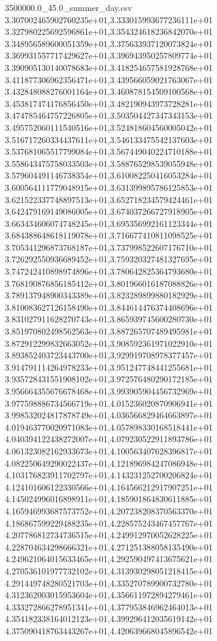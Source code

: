 \begin{filecontents*}{3500000.0_45.0_summer_day.csv}
3.307002465902760235e+01,3.333015993677236111e+01
3.327980225692596861e+01,3.354324618236842070e+01
3.348956589600051359e+01,3.375633937120073824e+01
3.369931557717429627e+01,3.396943950257809774e+01
3.390905130140078683e+01,3.418254657581928768e+01
3.411877306962356471e+01,3.439566059021763067e+01
3.432848088276001164e+01,3.460878154509100568e+01
3.453817474176856450e+01,3.482190943973728281e+01
3.474785464757226805e+01,3.503504427347343153e+01
3.495752060111540516e+01,3.524818604560005042e+01
3.516717260334437611e+01,3.546133475542137603e+01
3.537681065517799084e+01,3.567449040224710188e+01
3.558643475758033503e+01,3.588765298539055948e+01
3.579604491146738354e+01,3.610082250416053284e+01
3.600564111779048915e+01,3.631399895786125853e+01
3.621522337748897513e+01,3.652718234579424461e+01
3.642479169149086005e+01,3.674037266727918905e+01
3.663434606074748245e+01,3.695356992161123344e+01
3.684388648618119078e+01,3.716677410811098525e+01
3.705341296873768187e+01,3.737998522607176710e+01
3.726292550936689452e+01,3.759320327481327695e+01
3.747242410898974896e+01,3.780642825364793680e+01
3.768190876856185412e+01,3.801966016187088826e+01
3.789137948900343389e+01,3.823289899880182929e+01
3.810083627126158490e+01,3.844614476374408696e+01
3.831027911628270743e+01,3.865939745600280730e+01
3.851970802498562563e+01,3.887265707489495981e+01
3.872912299832663052e+01,3.908592361971022910e+01
3.893852403723443700e+01,3.929919708978377457e+01
3.914791114264978233e+01,3.951247748441255681e+01
3.935728431551908102e+01,3.972576480290172185e+01
3.956664355676678468e+01,3.993905904456732969e+01
3.977598886734566719e+01,4.015236020870906941e+01
3.998532024817878749e+01,4.036566829464663897e+01
4.019463770020971083e+01,4.057898330168518441e+01
4.040394122438272007e+01,4.079230522911893786e+01
4.061323082162933673e+01,4.100563407628396817e+01
4.082250649290022437e+01,4.121896984247086948e+01
4.103176823911702797e+01,4.143231252700206824e+01
4.124101606122330566e+01,4.164566212917907251e+01
4.145024996016898911e+01,4.185901864830611885e+01
4.165946993687573752e+01,4.207238208370563370e+01
4.186867599229488235e+01,4.228575243467457767e+01
4.207786812734736515e+01,4.249912970052628225e+01
4.228704634298666321e+01,4.271251388058135490e+01
4.249621064015633465e+01,4.292590497413675621e+01
4.270536101977732102e+01,4.313930298051218415e+01
4.291449748280521703e+01,4.335270789900732780e+01
4.312362003015953604e+01,4.356611972894279461e+01
4.333272866278951341e+01,4.377953846962464013e+01
4.354182338164012123e+01,4.399296412035619142e+01
4.375090418763443267e+01,4.420639668045896542e+01

\end{filecontents*}
